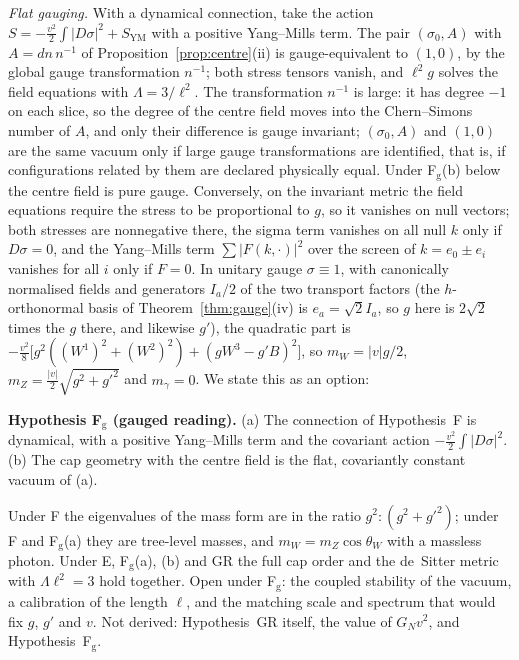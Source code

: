 \documentclass[aps,pra,onecolumn,superscriptaddress,nofootinbib,10pt]{revtex4-2}
\theoremstyle{definition}
\theoremstyle{remark}
\begin{document}
\smallskip\noindent\emph{Flat gauging.}  With a dynamical connection, take the action
$S=-\tfrac{v^2}2\int\lvert D\sigma\rvert^2+S_{\mathrm{YM}}$ with a positive Yang--Mills term.  The pair $(\sigma_0,A)$ with $A=dn\,n^{-1}$ of
Proposition~\ref{prop:centre}(ii) is gauge-equivalent to $(1,0)$, by the global gauge transformation $n^{-1}$;
both stress tensors vanish, and $\ell^2g$ solves the field equations with $\Lambda=3/\ell^2$.  The transformation $n^{-1}$ is
large: it has degree $-1$ on each slice, so the degree of the centre field moves into the Chern--Simons
number of $A$, and only their difference is gauge invariant; $(\sigma_0,A)$ and $(1,0)$ are the same vacuum only if
large gauge transformations are identified, that is, if configurations related by them are declared
physically equal.  Under F$_{\mathrm g}$(b) below the centre field is pure gauge.  Conversely, on the
invariant metric the field equations require the stress to be proportional to $g$, so it vanishes on null
vectors; both stresses are nonnegative there, the sigma term vanishes on all null $k$ only if $D\sigma=0$, and
the Yang--Mills term $\sum\lvert F(k,\cdot)\rvert^2$ over the screen of $k=e_0\pm e_i$ vanishes for all $i$ only if
$F=0$.  In unitary gauge $\sigma\equiv1$, with canonically normalised fields and generators $I_a/2$ of the two
transport factors (the $h$-orthonormal basis of Theorem~\ref{thm:gauge}(iv) is $e_a=\sqrt2I_a$, so $g$ here is $2\sqrt2$ times
the $g$ there, and likewise $g'$), the quadratic part is $-\tfrac{v^2}8\bigl[g^2((W^1)^2+(W^2)^2)+(gW^3-g'B)^2\bigr]$, so
$m_W=\lvert v\rvert g/2$, $m_Z=\tfrac{\lvert v\rvert}2\sqrt{g^2+g'^2}$ and $m_\gamma=0$.  We state this as an option:

\smallskip\noindent\textbf{Hypothesis F$_{\mathrm g}$ (gauged reading).}  (a) The connection of Hypothesis~F is
dynamical, with a positive Yang--Mills term and the covariant action $-\tfrac{v^2}2\int\lvert D\sigma\rvert^2$.  (b) The cap
geometry with the centre field is the flat, covariantly constant vacuum of (a).

\smallskip\noindent Under F the eigenvalues of the mass form are in the ratio $g^2:(g^2+g'^2)$; under F and
F$_{\mathrm g}$(a) they are tree-level masses, and $m_W=m_Z\cos\theta_W$ with a massless photon.  Under E,
F$_{\mathrm g}$(a), (b) and GR the full cap order and the de~Sitter metric with $\Lambda\ell^2=3$ hold together.  Open
under F$_{\mathrm g}$: the coupled stability of the vacuum, a calibration of the length $\ell$, and the
matching scale and spectrum that would fix $g$, $g'$ and $v$.  Not derived: Hypothesis~GR itself, the
value of $G_Nv^2$, and Hypothesis~F$_{\mathrm g}$.
\end{document}
